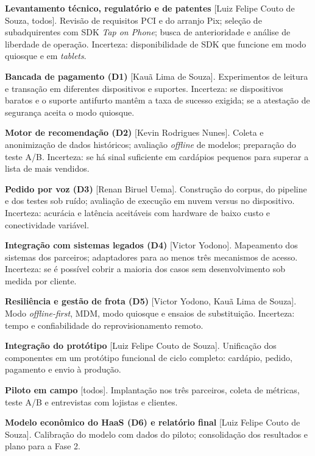 \documentclass[12pt,a4paper]{article}
\begin{document}
\begin{description}[leftmargin=1.1cm, labelindent=0pt, style=sameline]
    \item[A1.] \textbf{Levantamento técnico, regulatório e de patentes} [Luiz Felipe Couto de Souza, todos]. Revisão de requisitos PCI e do arranjo Pix; seleção de subadquirentes com SDK \textit{Tap on Phone}; busca de anterioridade e análise de liberdade de operação. Incerteza: disponibilidade de SDK que funcione em modo quiosque e em \textit{tablets}.
    \item[A2.] \textbf{Bancada de pagamento (D1)} [Kauã Lima de Souza]. Experimentos de leitura e transação em diferentes dispositivos e suportes. Incerteza: se dispositivos baratos e o suporte antifurto mantêm a taxa de sucesso exigida; se a atestação de segurança aceita o modo quiosque.
    \item[A3.] \textbf{Motor de recomendação (D2)} [Kevin Rodrigues Nunes]. Coleta e anonimização de dados históricos; avaliação \textit{offline} de modelos; preparação do teste A/B. Incerteza: se há sinal suficiente em cardápios pequenos para superar a lista de mais vendidos.
    \item[A4.] \textbf{Pedido por voz (D3)} [Renan Biruel Uema]. Construção do corpus, do pipeline e dos testes sob ruído; avaliação de execução em nuvem versus no dispositivo. Incerteza: acurácia e latência aceitáveis com hardware de baixo custo e conectividade variável.
    \item[A5.] \textbf{Integração com sistemas legados (D4)} [Victor Yodono]. Mapeamento dos sistemas dos parceiros; adaptadores para ao menos três mecanismos de acesso. Incerteza: se é possível cobrir a maioria dos casos sem desenvolvimento sob medida por cliente.
    \item[A6.] \textbf{Resiliência e gestão de frota (D5)} [Victor Yodono, Kauã Lima de Souza]. Modo \textit{offline-first}, MDM, modo quiosque e ensaios de substituição. Incerteza: tempo e confiabilidade do reprovisionamento remoto.
    \item[A7.] \textbf{Integração do protótipo} [Luiz Felipe Couto de Souza]. Unificação dos componentes em um protótipo funcional de ciclo completo: cardápio, pedido, pagamento e envio à produção.
    \item[A8.] \textbf{Piloto em campo} [todos]. Implantação nos três parceiros, coleta de métricas, teste A/B e entrevistas com lojistas e clientes.
    \item[A9.] \textbf{Modelo econômico do HaaS (D6) e relatório final} [Luiz Felipe Couto de Souza]. Calibração do modelo com dados do piloto; consolidação dos resultados e plano para a Fase 2.
\end{description}
\end{document}

